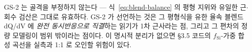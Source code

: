 \begin{warnbox}
GS-2 는 골격을 부정하지 않는다 --- 식~\eqref{eq:blend-balance} 의 평형 지위와 유일한 근$\cdot$회수 검산은
그대로 유효하다. GS-2 가 선언하는 것은 그 평형식을 유한 율속 블렌드 dQ/dV 에 \emph{완전 동시반응으로
직결}하는 읽기가 1차 근사라는 점, 그리고 그 편차의 정량 모델링이 범위 밖이라는 점이다. 이 명시적 분리가
없으면 §3.5 코드의 $f_\mathrm{Si}$-가중 합성 곡선을 실측과 1:1 로 오인할 위험이 있다.
\end{warnbox}

